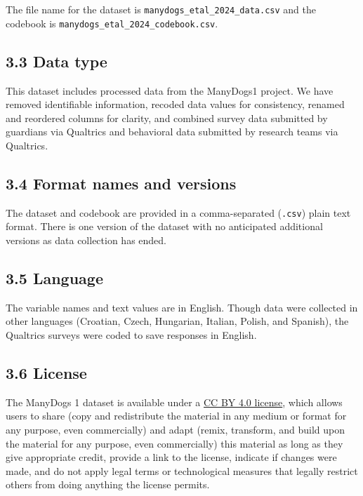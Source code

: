 \documentclass[
  man,floatsintext]{apa6}
\begin{document}
The file name for the dataset is \texttt{manydogs\_etal\_2024\_data.csv} and the codebook is \texttt{manydogs\_etal\_2024\_codebook.csv}.

\hypertarget{data-type}{%
\subsection{3.3 Data type}\label{data-type}}

This dataset includes processed data from the ManyDogs1 project. We have removed identifiable information, recoded data values for consistency, renamed and reordered columns for clarity, and combined survey data submitted by guardians via Qualtrics and behavioral data submitted by research teams via Qualtrics.

\hypertarget{format-names-and-versions}{%
\subsection{3.4 Format names and versions}\label{format-names-and-versions}}

The dataset and codebook are provided in a comma-separated (\texttt{.csv}) plain text format. There is one version of the dataset with no anticipated additional versions as data collection has ended.

\hypertarget{language}{%
\subsection{3.5 Language}\label{language}}

The variable names and text values are in English. Though data were collected in other languages (Croatian, Czech, Hungarian, Italian, Polish, and Spanish), the Qualtrics surveys were coded to save responses in English.

\hypertarget{license}{%
\subsection{3.6 License}\label{license}}

The ManyDogs 1 dataset is available under a \href{https://creativecommons.org/licenses/by/4.0/}{CC BY 4.0 license}, which allows users to share (copy and redistribute the material in any medium or format for any purpose, even commercially) and adapt (remix, transform, and build upon the material for any purpose, even commercially) this material as long as they give appropriate credit, provide a link to the license, indicate if changes were made, and do not apply legal terms or technological measures that legally restrict others from doing anything the license permits.
\end{document}
